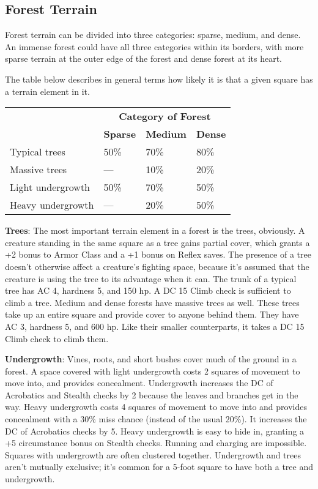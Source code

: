 \subsection{Forest Terrain}

				
Forest terrain can be divided into three categories: sparse, medium, and dense. An immense forest could have all three categories within its borders, with more sparse terrain at the outer edge of the forest and dense forest at its heart. 
				
The table below describes in general terms how likely it is that a given square has a terrain element in it.

\begin{tabular}{llll}
 & \multicolumn{3}{c}{\textbf{Category of Forest}} \\
 & \textbf{Sparse} & \textbf{Medium} & \textbf{Dense}\\
Typical trees& 50\% & 70\% & 80\%\\
Massive trees & --- & 10\% & 20\%\\
Light undergrowth & 50\%  & 70\% & 50\%\\
Heavy undergrowth & --- & 20\% & 50\%\\
\end{tabular}
				
\textbf{Trees}: The most important terrain element in a forest is the trees, obviously. A creature standing in the same square as a tree gains partial cover, which grants a +2 bonus to Armor Class and a +1 bonus on Reflex saves. The presence of a tree doesn't otherwise affect a creature's fighting space, because it's assumed that the creature is using the tree to its advantage when it can. The trunk of a typical tree has AC 4, hardness 5, and 150 hp. A DC 15 Climb check is sufficient to climb a tree. Medium and dense forests have massive trees as well. These trees take up an entire square and provide cover to anyone behind them. They have AC 3, hardness 5, and 600 hp. Like their smaller counterparts, it takes a DC 15 Climb check to climb them.
				
\textbf{Undergrowth}: Vines, roots, and short bushes cover much of the ground in a forest. A space covered with light undergrowth costs 2 squares of movement to move into, and provides concealment. Undergrowth increases the DC of Acrobatics and Stealth checks by 2 because the leaves and branches get in the way. Heavy undergrowth costs 4 squares of movement to move into and provides concealment with a 30\% miss chance (instead of the usual 20\%). It increases the DC of Acrobatics checks by 5. Heavy undergrowth is easy to hide in, granting a +5 circumstance bonus on Stealth checks. Running and charging are impossible. Squares with undergrowth are often clustered together. Undergrowth and trees aren't mutually exclusive; it's common for a 5-foot square to have both a tree and undergrowth.
				
